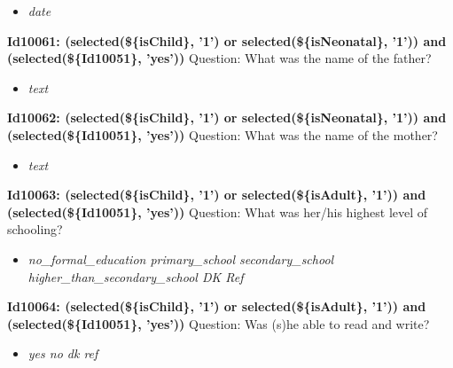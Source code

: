 \documentclass{article}%
\begin{document}
%
\begin{itemize}%
\item%
\textit{date\newline%
}%
\end{itemize}%
\textbf{Id10061: (selected(\$\{isChild\}, '1') or selected(\$\{isNeonatal\}, '1')) and (selected(\$\{Id10051\}, 'yes'))\newline%
}%
Question: What was the name of the father?\newline%
%
\begin{itemize}%
\item%
\textit{text\newline%
}%
\end{itemize}%
\textbf{Id10062: (selected(\$\{isChild\}, '1') or selected(\$\{isNeonatal\}, '1')) and (selected(\$\{Id10051\}, 'yes'))\newline%
}%
Question: What was the name of the mother?\newline%
%
\begin{itemize}%
\item%
\textit{text\newline%
}%
\end{itemize}%
\textbf{Id10063: (selected(\$\{isChild\}, '1') or selected(\$\{isAdult\}, '1')) and (selected(\$\{Id10051\}, 'yes'))\newline%
}%
Question: What was her/his highest level of schooling?\newline%
%
\begin{itemize}%
\item%
\textit{no\_formal\_education\newline%
 primary\_school\newline%
 secondary\_school\newline%
 higher\_than\_secondary\_school\newline%
 DK\newline%
 Ref\newline%
}%
\end{itemize}%
\textbf{Id10064: (selected(\$\{isChild\}, '1') or selected(\$\{isAdult\}, '1')) and (selected(\$\{Id10051\}, 'yes'))\newline%
}%
Question: Was (s)he able to read and write?\newline%
%
\begin{itemize}%
\item%
\textit{yes\newline%
 no\newline%
 dk\newline%
 ref\newline%
}%
\end{itemize}%
\end{document}
